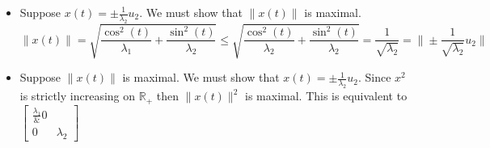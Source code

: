 \documentclass[12pt, letterpaper]{article}
\newcommand{\R}{\mathbb{R}}
\begin{document}
\begin{enumerate}
\begin{itemize}
\begin{itemize}
				\item Suppose $x(t) = \pm \frac{1}{\lambda_2} u_2$.  We must show that $\|x(t)\|$ is maximal.  
				$$
				\|x(t)\| = \sqrt{\frac{\cos^2(t)}{\lambda_1} + \frac{\sin^2(t)}{\lambda_2} } \leq  \sqrt{\frac{\cos^2(t)}{\lambda_2} + \frac{\sin^2(t)}{\lambda_2} } = \frac{1}{\sqrt{\lambda_2}} = \|\pm \frac{1}{\sqrt{\lambda_2}} u_2\|			
				$$
				\item Suppose $\|x(t)\|$ is maximal.  We must show that $x(t) = \pm \frac{1}{\lambda_2} u_2$.  Since $x^2$ is strictly increasing on $\R_+$ then $\|x(t)\|^2$ is maximal.  This is equivalent to $\begin{bmatrix}
			\frac{\lambda_1} & 0\\ 0 & \lambda_2	
\end{bmatrix}				 $
			\end{itemize}
		\end{itemize}
	\end{enumerate}
\end{document}
